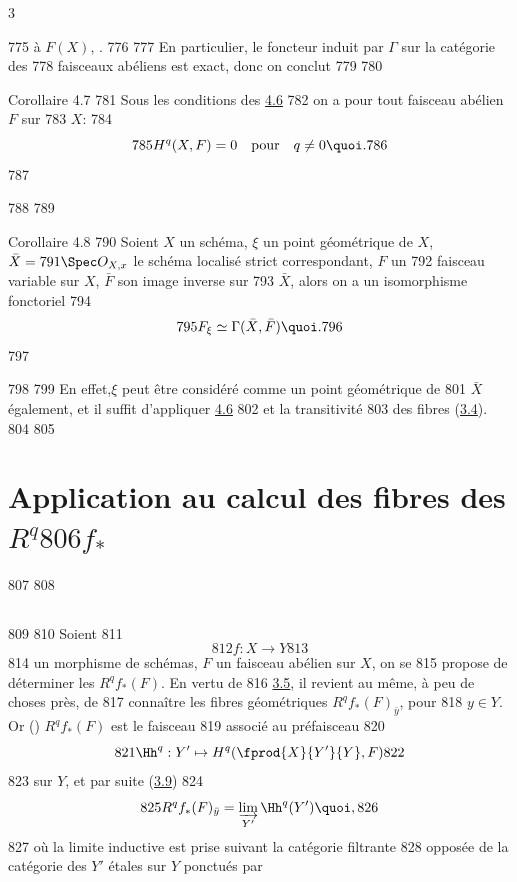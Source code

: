 3	\documentclass[10pt]{../fichiers-configuration-latex/smfart}
\begin{document}
   775	à $F(X)$, \cqfd.
   776	
   777	En particulier, le foncteur induit par $\Gamma$ sur la catégorie des
   778	faisceaux abéliens est exact, donc on conclut
   779	
   780	\begin{enonce*}{Corollaire 4.7}
   781	Sous les conditions des \hyperref[VIII.prop4.6]{4.6}
   782	on a pour tout faisceau abélien $F$ sur
   783	$X$:
   784	$$
   785	H^q (X, F) = 0\quad \mbox{\rm pour}\quad q \neq 0{\quoi}.
   786	$$
   787	\end{enonce*}
   788	
   789	\begin{enonce*}{Corollaire 4.8}
   790	Soient $X$ un schéma, $\xi$ un point géométrique de $X$, $\bar{X} =
   791	\Spec O_{X, x}$ le schéma localisé strict correspondant, $F$ un
   792	faisceau variable sur $X$, $\bar{F}$ son image inverse sur
   793	$\bar{X}$, alors on a un isomorphisme fonctoriel
   794	$$
   795	F_{\xi} \simeq \Gamma (\bar{X}, \bar{F}){\quoi}.
   796	$$
   797	\end{enonce*}
   798	
   799		En effet,\pageoriginale $\xi$ peut être considéré comme un point géométrique de
   801	$\bar{X}$ également, et il suffit d'appliquer \hyperref[VIII.prop4.6]{4.6}
   802	et la transitivité
   803	des fibres (\hyperref[VIII.subsec3.4]{3.4}).
   804	
   805	\section{Application au calcul des fibres des $R^{q}
   806	  f_{*}$}
   807	
   808	\subsection{}
   809	
   810	Soient
   811	$$
   812	f : X \to Y
   813	$$
   814	un morphisme de schémas, $F$ un faisceau abélien sur $X$, on se
   815	propose de déterminer les $R^q f_{\ast} (F)$. En vertu de
   816	\hyperref[VIII.thm3.5]{3.5}, il revient au même, à peu de choses près, de
   817	connaître les fibres géométriques $R^q f_{\ast} (F)_{\bar{y}}$, pour
   818	$y \in Y$. Or () $R^q f_{\ast}(F)$ est le faisceau
   819	associé au préfaisceau
   820	$$
   821	\Hh^q : Y' \mapsto H^q (\fprod{X}{Y'}{Y}, F)
   822	$$
   823	sur $Y$, et par suite (\hyperref[VIII.prop3.9]{3.9})
   824	$$
   825	R^q f_{\ast} (F)_{\bar{y}} = \varinjlim_{Y'} \Hh^q (Y'){\quoi},
   826	$$
   827	où la limite inductive est prise suivant la catégorie filtrante
   828	opposée de la catégorie des $Y'$ étales sur $Y$ ponctués par
\end{document}

